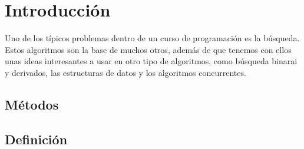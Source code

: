 \documentclass[12pt, fleqn]{article}                             %
\theoremstyle{break}                                            %
\begin{document}
\restoregeometry                                                    %
\nopagecolor                                                        %




\tableofcontents{}
\label{sec:Index}




\clearpage
\section{Introducción}


    Uno de los típicos problemas dentro de un curso de programación es la búsqueda.
    Estos algoritmos son la base de muchos otros, además de que tenemos con ellos unas ideas
    interesantes a usar en otro tipo de algoritmos, como búsqueda binarai y derivados, las
    estructuras de datos y los algoritmos concurrentes.

    \subsection{Métodos}

    \subsection{Definición}


\end{document}
